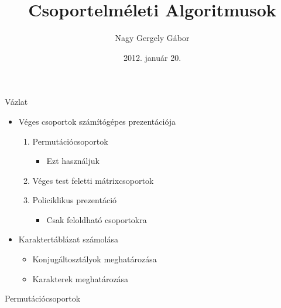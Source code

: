 \documentclass[mathserif]{beamer}
\begin{document}
\title[Csoportelméleti Algoritmusok]{Csoportelméleti Algoritmusok}
\author{Nagy Gergely Gábor}
\date{2012. január 20.}

\begin{frame}
\titlepage
\end{frame}

\begin{frame}{Vázlat}
\begin{itemize}
\item Véges csoportok számítógépes prezentációja
	\begin{enumerate}
	\item Permutációcsoportok
		\begin{itemize}
		\item Ezt használjuk
		\end{itemize}
	\item Véges test feletti mátrixcsoportok
	\item Policiklikus prezentáció
		\begin{itemize}
		\item Csak feloldható csoportokra
		\end{itemize}
	\end{enumerate}
\item Karaktertáblázat számolása
	\begin{itemize}
	\item Konjugáltosztályok meghatározása
	\item Karakterek meghatározása
	\end{itemize}
\end{itemize}
\end{frame}

\begin{frame}{Permutációcsoportok}

\end{frame}
\end{document}
